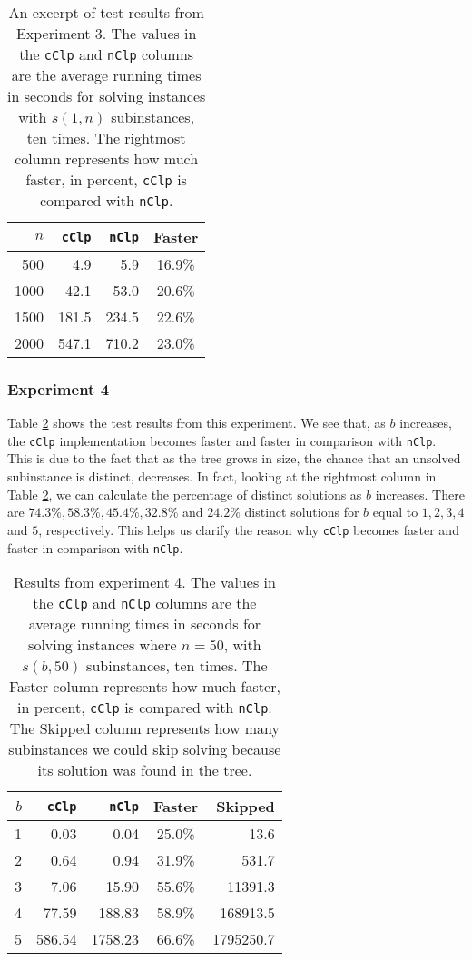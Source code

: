 \begin{table}[ht!]
    \centering
    \caption{An excerpt of test results from Experiment 3.
             The values in the \texttt{cClp} and \texttt{nClp} columns are the
             average running times in seconds for solving instances with
             $s(1, n)$ subinstances, ten times.
             The rightmost column represents how much faster, in percent,
             \texttt{cClp} is compared with \texttt{nClp}.}
    \label{table:expfour}
\begin{tabular}{rrrc}
    $n$ & \texttt{cClp}  & \texttt{nClp}  & Faster \\ \hline
    500 & 4.9   & 5.9   & 16.9\% \\
   1000 & 42.1  & 53.0  & 20.6\% \\
   1500 & 181.5 & 234.5 & 22.6\% \\
   2000 & 547.1 & 710.2 & 23.0\%
\end{tabular}
\end{table}

\subsubsection{Experiment 4}
Table \ref{table:exptwo} shows the test results from this experiment. We see
that, as $b$ increases, the \texttt{cClp} implementation becomes
faster and faster in comparison with \texttt{nClp}.
This is due to the fact that as the tree grows in size, the chance that
an unsolved subinstance is distinct, decreases. In fact, looking at the
rightmost column in Table \ref{table:exptwo}, we can calculate the percentage
of distinct solutions as $b$ increases.
There are $74.3\%, 58.3\%, 45.4\%, 32.8\%$ and $24.2\%$ distinct solutions for
$b$ equal to $1,2,3,4$ and $5$, respectively. This helps us clarify the reason
why \texttt{cClp} becomes faster and faster in comparison with \texttt{nClp}.
\begin{table}[ht!]
\centering
\caption{Results from experiment 4.
         The values in the \texttt{cClp} and \texttt{nClp} columns are the
         average running times in seconds for solving instances where $n = 50$,
         with $s(b, 50)$ subinstances, ten times.
         The Faster column represents how much faster, in percent,
         \texttt{cClp} is compared with \texttt{nClp}.
         The Skipped column represents how many subinstances we could skip
         solving because its solution was found in the tree.
         }
\begin{tabular}{rrrcr}
      $b$ & \texttt{cClp} & \texttt{nClp} & Faster & Skipped\\ \hline
       1  & 0.03 & 0.04 & 25.0\% & 13.6 \\
       2  & 0.64 & 0.94 & 31.9\% & 531.7 \\
       3  & 7.06 & 15.90 & 55.6\% & 11391.3 \\
       4  & 77.59 & 188.83 & 58.9\% & 168913.5 \\
       5  & 586.54 & 1758.23 & 66.6\% & 1795250.7 \\
\end{tabular}
\label{table:exptwo}
\end{table}

